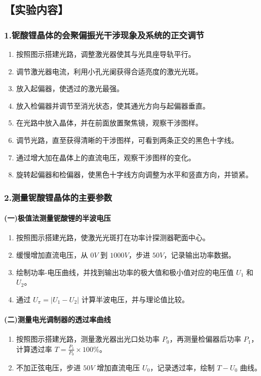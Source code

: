 \documentclass[12pt,a4paper,UTF8]{ctexart}
\begin{document}
\subsection*{【实验内容】}

\subsubsection*{1.铌酸锂晶体的会聚偏振光干涉现象及系统的正交调节}
	
	\begin{enumerate}
		\item 按照图示搭建光路，调整激光器使其与光具座导轨平行。
		\item 调节激光器电流，利用小孔光阑获得合适亮度的激光光斑。
		\item 放入起偏器，使透过的激光最强。
		\item 放入检偏器并调节至消光状态，使其通光方向与起偏器垂直。
		\item 在光路中放入晶体，并在前面放置聚焦镜，观察干涉图样。
		\item 调节光路，直至获得清晰的干涉图样，可看到两条正交的黑色十字线。
		\item 通过增大加在晶体上的直流电压，观察干涉图样的变化。
		\item 旋转起偏器和检偏器，使黑色十字线方向调整为水平和竖直方向，并锁紧。
	\end{enumerate}
	
\subsubsection*{2.测量铌酸锂晶体的主要参数}
	
	\paragraph*{(一)极值法测量铌酸锂的半波电压}
	
	\begin{enumerate}
		\item 按照图示搭建光路，使激光光斑打在功率计探测器靶面中心。
		\item 缓慢增加直流电压，从 $0V$ 到 $1000V$，步进 $50V$，记录输出功率数据。
		\item 绘制功率-电压曲线，并找到输出功率的极大值和极小值对应的电压值 $U_1$ 和 $U_2$。
		\item 通过 $U_\pi = |U_1 - U_2|$ 计算半波电压，并与理论值比较。
	\end{enumerate}
	
	\paragraph*{(二)测量电光调制器的透过率曲线}
	\begin{enumerate}
		\item 按照图示搭建光路，测量激光器出光口处功率 $P_0$，再测量检偏器后功率 $P_1$，计算透过率 $T = \frac{P_1}{P_0} \times 100\%$。
		\item 不加正弦电压，步进 $50V$ 增加直流电压 $U_0$，记录透过率，绘制 $T - U_0$ 曲线。
	\end{enumerate}
	
\end{document}
